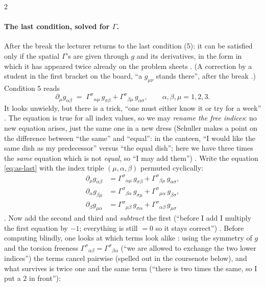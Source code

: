 \begin{paracol}{2}
\paragraph{The last condition, solved for $\Gamma$.} After the break the lecturer returns to the last condition (5): it can be satisfied only if the spatial $\Gamma$'s are given through $g$ and its derivatives, in the form in which it has appeared twice already on the problem sheets .
(A correction by a student in the first bracket on the board, ``a $g_{\mu\nu}$ stands there'', after the break .)
Condition 5 reads
\begin{equation}\label{eq:as-last}
  \partial_\mu g_{\alpha\beta}\;=\;\Gamma^\sigma{}_{\alpha\mu}\,g_{\sigma\beta}+\Gamma^\sigma{}_{\beta\mu}\,g_{\alpha\sigma},\qquad\alpha,\beta,\mu=1,2,3 .
\end{equation}
It looks unwieldy, but there is a trick, ``one must either know it or try for a week'' . The equation is true for all index values, so we may \emph{rename the free indices}: no new equation arises, just the same one in a new dress (Schuller makes a point
on the difference between ``the same'' and ``equal'': in the canteen, ``I would like the same dish as my predecessor'' versus ``the equal dish''; here we have three times the \emph{same} equation which is not \emph{equal}, so ``I may add them'')
. Write the equation \eqref{eq:as-last} with the index triple $(\mu,\alpha,\beta)$ permuted cyclically:
\begin{align*}
  \partial_\mu g_{\alpha\beta}&=\Gamma^\sigma{}_{\alpha\mu}\,g_{\sigma\beta}+\Gamma^\sigma{}_{\beta\mu}\,g_{\alpha\sigma},\\
  \partial_\alpha g_{\beta\mu}&=\Gamma^\sigma{}_{\beta\alpha}\,g_{\sigma\mu}+\Gamma^\sigma{}_{\mu\alpha}\,g_{\beta\sigma},\\
  \partial_\beta g_{\mu\alpha}&=\Gamma^\sigma{}_{\mu\beta}\,g_{\sigma\alpha}+\Gamma^\sigma{}_{\alpha\beta}\,g_{\mu\sigma}
\end{align*}
. Now add the second and third and \emph{subtract} the first (``before I add I multiply the first equation by $-1$; everything is still $=0$ so it stays correct'') . Before computing blindly, one looks at which terms look alike :
using the symmetry of $g$ and the torsion freeness $\Gamma^\sigma{}_{\alpha\beta}=\Gamma^\sigma{}_{\beta\alpha}$ (``we are allowed to exchange the two lower indices'') the terms cancel pairwise (spelled out in the coursenote below), and what survives is twice one and the same term (``there is two times the same, so I put a $2$ in front''):

\end{paracol}
